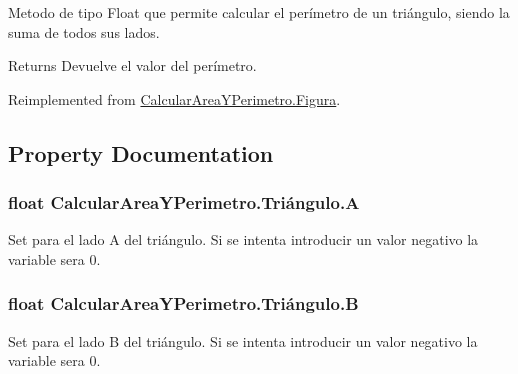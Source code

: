 Metodo de tipo Float que permite calcular el perímetro de un triángulo, siendo la suma de todos sus lados. 

\begin{DoxyReturn}{Returns}
Devuelve el valor del perímetro.
\end{DoxyReturn}


Reimplemented from \hyperlink{class_calcular_area_y_perimetro_1_1_figura_a501d20cb8d81cdbb12e0dadc48ba2f87}{Calcular\+Area\+Y\+Perimetro.\+Figura}.



\subsection{Property Documentation}
\hypertarget{class_calcular_area_y_perimetro_1_1_tri_xC3_xA1ngulo_af3c271639fdbaad3825bba7f0490e13b}{}
\subsubsection[{A}]{\setlength{\rightskip}{0pt plus 5cm}float Calcular\+Area\+Y\+Perimetro.\+Triángulo.\+A\hspace{0.3cm}{\ttfamily [set]}}\label{class_calcular_area_y_perimetro_1_1_tri_xC3_xA1ngulo_af3c271639fdbaad3825bba7f0490e13b}


Set para el lado A del triángulo. Si se intenta introducir un valor negativo la variable sera 0. 

\hypertarget{class_calcular_area_y_perimetro_1_1_tri_xC3_xA1ngulo_a4112d330d1d2b05fc6a2c21d68dfd9d2}{}
\subsubsection[{B}]{\setlength{\rightskip}{0pt plus 5cm}float Calcular\+Area\+Y\+Perimetro.\+Triángulo.\+B\hspace{0.3cm}{\ttfamily [set]}}\label{class_calcular_area_y_perimetro_1_1_tri_xC3_xA1ngulo_a4112d330d1d2b05fc6a2c21d68dfd9d2}


Set para el lado B del triángulo. Si se intenta introducir un valor negativo la variable sera 0. 

